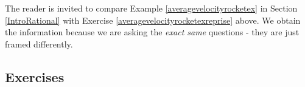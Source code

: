 The reader is invited to compare Example \ref{averagevelocityrocketex} in Section \ref{IntroRational} with Exercise \ref{averagevelocityrocketexreprise} above. We obtain the  information because we are asking the \textit{exact same} questions - they are just framed differently.


\clearpage

\subsection{Exercises}




\closegraphsfile

